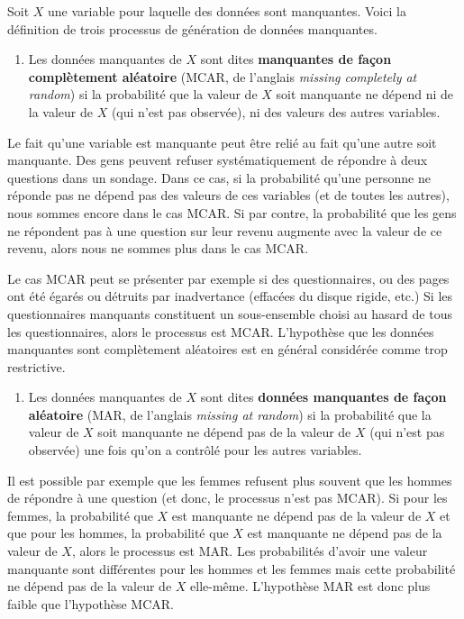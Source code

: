 \documentclass[
  11pt,
  letterpaper,
]{book}
\providecommand{\tightlist}{%
  \setlength{\itemsep}{0pt}\setlength{\parskip}{0pt}}
\theoremstyle{definition}
\theoremstyle{definition}
\theoremstyle{definition}
\theoremstyle{definition}
\theoremstyle{remark}
\begin{document}
Soit \(X\) une variable pour laquelle des données sont manquantes. Voici la définition de trois processus de génération de données manquantes.

\begin{enumerate}
\def\labelenumi{\arabic{enumi})}
\tightlist
\item
  Les données manquantes de \(X\) sont dites \textbf{manquantes de façon complètement aléatoire} (MCAR, de l'anglais \emph{missing completely at random}) si la probabilité que la valeur de \(X\) soit manquante ne dépend ni de la valeur de \(X\) (qui n'est pas observée), ni des valeurs des autres variables.
\end{enumerate}

Le fait qu'une variable est manquante peut être relié au fait qu'une autre soit manquante. Des gens peuvent refuser systématiquement de répondre à deux questions dans un sondage. Dans ce cas, si la probabilité qu'une personne ne réponde pas ne dépend pas des valeurs de ces variables (et de toutes les autres), nous sommes encore dans le cas MCAR. Si par contre, la probabilité que les gens ne répondent pas à une question sur leur revenu augmente avec la valeur de ce revenu, alors nous ne sommes plus dans le cas MCAR.

Le cas MCAR peut se présenter par exemple si des questionnaires, ou des pages ont été égarés ou détruits par inadvertance (effacées du disque rigide, etc.) Si les questionnaires manquants constituent un sous-ensemble choisi au hasard de tous les questionnaires, alors le processus est MCAR. L'hypothèse que les données manquantes sont complètement aléatoires est en général considérée comme trop restrictive.

\begin{enumerate}
\def\labelenumi{\arabic{enumi})}
\setcounter{enumi}{1}
\tightlist
\item
  Les données manquantes de \(X\) sont dites \textbf{données manquantes de façon aléatoire} (MAR, de l'anglais \emph{missing at random}) si la probabilité que la valeur de \(X\) soit manquante ne dépend pas de la valeur de \(X\) (qui n'est pas observée) une fois qu'on a contrôlé pour les autres variables.
\end{enumerate}

Il est possible par exemple que les femmes refusent plus souvent que les hommes de répondre à une question (et donc, le processus n'est pas MCAR). Si pour les femmes, la probabilité que \(X\) est manquante ne dépend pas de la valeur de \(X\) et que pour les hommes, la probabilité que \(X\) est manquante ne dépend pas de la valeur de \(X\), alors le processus est MAR. Les probabilités d'avoir une valeur manquante sont différentes pour les hommes et les femmes mais cette probabilité ne dépend pas de la valeur de \(X\) elle-même. L'hypothèse MAR est donc plus faible que l'hypothèse MCAR.
\end{document}
